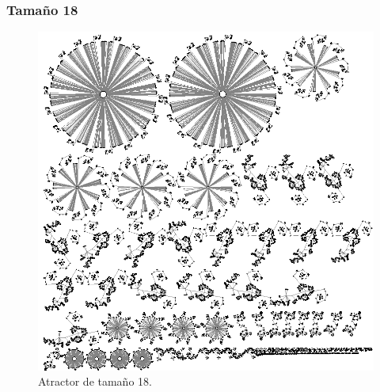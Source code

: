 \documentclass[11pt]{article}
\begin{document}
			\subsubsection{Tamaño 18}
			\begin{figure}[H]
			\centering
			\includegraphics[scale=0.8]{resources/Atractores54/atractor_54_size_18.png}
			\caption{Atractor de tamaño 18.}\label{fig:picture}
			\end{figure}
\end{document}
